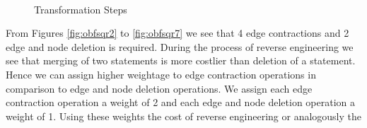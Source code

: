 \documentclass[twocolumn]{article}
\begin{document}
\begin{figure}[ht!]
{	\label{fig:obfsqr4}
 }
 \\
\caption{Transformation Steps}
\label{fig:transfrm}
\end{figure}
From Figures \ref{fig:obfsqr2} to \ref{fig:obfsqr7} we see that 4 edge contractions and 2 edge and node deletion is required. During the process of reverse engineering we see that merging 
of two statements is more costlier than deletion of a statement. Hence we can assign higher weightage to edge contraction operations in comparison to edge and node deletion operations. 
We assign each edge contraction operation a weight of 2 and each edge and node deletion operation a weight of 1. Using these weights the cost of reverse engineering or analogously the 
\end{document}
